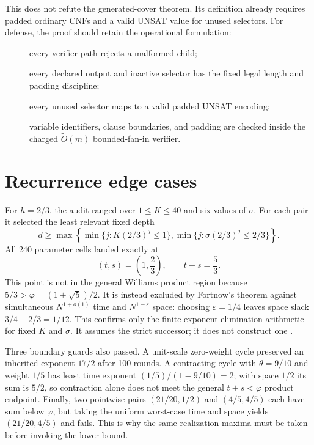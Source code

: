 \documentclass[11pt]{article}
\begin{document}
This does not refute the generated-cover theorem.  Its definition already
requires padded ordinary CNFs and a valid UNSAT value for unused selectors.
For defense, the proof should retain the operational formulation:
\begin{description}
\item[] every verifier path rejects a malformed child;
\item[] every declared output and inactive selector has the fixed legal
length and padding discipline;
\item[] every unused selector maps to a valid padded UNSAT encoding;
\item[] variable identifiers, clause boundaries, and padding are checked
inside the charged $\widetilde O(m)$ bounded-fan-in verifier.
\end{description}

\section{Recurrence edge cases}

For $h=2/3$, the audit ranged over $1\le K\le40$ and six values of $\sigma$.
For each pair it selected the least relevant fixed depth
\[
 d\ge
 \max\left\{
  \min\{j:K(2/3)^j\le1\},
  \min\{j:\sigma(2/3)^j\le2/3\}
 \right\}.
\]
All 240 parameter cells landed exactly at
\[
       (t,s)=\left(1,\frac23\right),
       \qquad t+s=\frac53.
\]
This point is not in the general Williams product region because
$5/3>\varphi=(1+\sqrt5)/2$.  It is instead excluded by Fortnow's theorem
against simultaneous $N^{1+o(1)}$ time and $N^{1-\varepsilon}$ space:
choosing $\varepsilon=1/4$ leaves space slack
$3/4-2/3=1/12$.  This confirms only the finite exponent-elimination
arithmetic for fixed $K$ and $\sigma$.  It assumes the strict successor; it
does not construct one \cite{williams2010,fortnow2000}.

Three boundary guards also passed.  A unit-scale zero-weight cycle preserved
an inherited exponent $17/2$ after 100 rounds.  A contracting cycle with
$\theta=9/10$ and weight $1/5$ has least time exponent
$(1/5)/(1-9/10)=2$; with space $1/2$ its sum is $5/2$, so contraction alone
does not meet the general $t+s<\varphi$ product endpoint.  Finally, two
pointwise pairs $(21/20,1/2)$ and $(4/5,4/5)$ each have sum below
$\varphi$, but taking the uniform worst-case time and space yields
$(21/20,4/5)$ and fails.  This is why
the same-realization maxima must be taken before invoking the lower bound.
\end{document}
